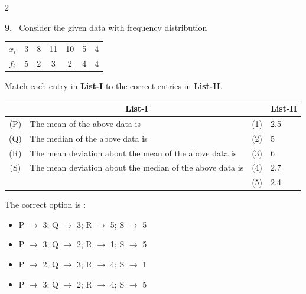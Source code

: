 \documentclass[10pt]{extarticle}
\newcommand{\qn}[1]{\par\smallskip\noindent\textbf{#1.}~}
\newenvironment{qoptions}{\begin{itemize}[leftmargin=1.8em,itemsep=1pt,topsep=2pt,label={}]}{\end{itemize}}
\newcommand{\opt}[2]{\item[(#1)] #2}
\begin{document}
\begin{multicols}{2}
\qn{9} Consider the given data with frequency distribution\\\par\nobreak
\begin{center}\small
\begin{tabular}{l|cccccc}
$x_i$ & 3 & 8 & 11 & 10 & 5 & 4 \\
$f_i$ & 5 & 2 & 3 & 2 & 4 & 4 \\
\end{tabular}
\end{center}
Match each entry in \textbf{List-I} to the correct entries in \textbf{List-II}.\par\nobreak
\begin{center}\small\setlength{\tabcolsep}{3pt}
\begin{tabular}{|c|p{3.7cm}|c|p{0.8cm}|}
\hline
 & \multicolumn{1}{c|}{\textbf{List-I}} & & \multicolumn{1}{c|}{\textbf{\footnotesize List-II}} \\
\hline
(P) & The mean of the above data is & (1) & 2.5 \\
\hline
(Q) & The median of the above data is & (2) & 5 \\
\hline
(R) & The mean deviation about the mean of the above data is & (3) & 6 \\
\hline
(S) & The mean deviation about the median of the above data is & (4) & 2.7 \\
\hline
 & & (5) & 2.4 \\
\hline
\end{tabular}
\end{center}
The correct option is :
\begin{qoptions}
\opt{A}{P $\to$ 3; Q $\to$ 3; R $\to$ 5; S $\to$ 5}
\opt{B}{P $\to$ 3; Q $\to$ 2; R $\to$ 1; S $\to$ 5}
\opt{C}{P $\to$ 2; Q $\to$ 3; R $\to$ 4; S $\to$ 1}
\opt{D}{P $\to$ 3; Q $\to$ 2; R $\to$ 4; S $\to$ 5}
\end{qoptions}


\end{multicols}
\end{document}
